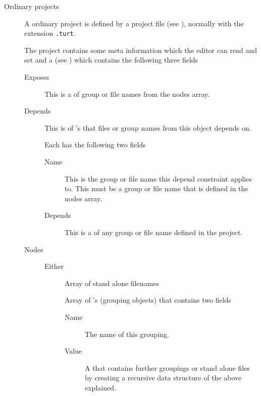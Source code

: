 \begin{description}
\item[Ordinary projects] A ordinary project is defined by a project file (see
  ), normally with the extension \texttt{.turt}.

  The project contains some meta information which the editor can read and set
  and a  (see ) which
  contains the following three fields

  \begin{description}
  \item[Exposes] This is a  of group or file names from
    the nodes array.

  \item[Depends] This is  of 's that
    files or group names from this object depends on.

    Each  has the following two fields

    \begin{description}
    \item[Name] This is the group or file name this depend constraint applies
      to. This must be a group or file name that is defined in the nodes array. 

    \item[Depends] This is a  of any group or file name
      defined in the project. 
    \end{description}

  \item[Nodes] Either
    \begin{description}
      \item[] Array of stand alone filenames

      \item[] Array of 's
        (grouping objects) that contains two fields 

        \begin{description}
        \item[Name] The name of this grouping.

        \item[Value] A  that contains further groupings or
          stand alone files by creating a recursive data structure of the above
          explained.
        \end{description}
    \end{description}
  \end{description}


\end{description}
